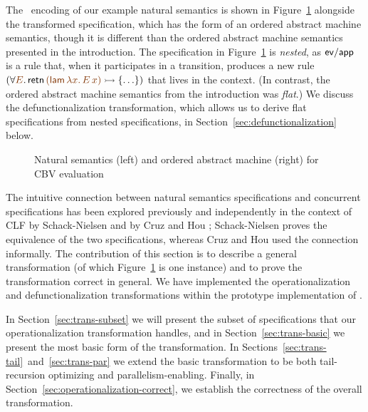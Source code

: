 The \sls~encoding of our example natural semantics is shown in
Figure~\ref{fig:example-transform-cbv} alongside the transformed
specification, which has the form of an ordered abstract machine
semantics, though it is different than the ordered abstract machine
semantics presented in the introduction. The specification in 
Figure~\ref{fig:example-transform-cbv} is 
{\it nested}, as ${\sf ev/app}$ is a rule that, when it
participates in a transition, produces a new rule $(\forall
\lf{E}.\,{\sf retn}\,\lf{({\sf lam}\,\lambda x.\,E\,x)} \lefti \{
\ldots \})$ that lives in the context. (In contrast, the ordered
abstract machine semantics from the introduction was {\it flat}.)  We
discuss the defunctionalization transformation, which allows us to
derive flat specifications from nested specifications, in
Section~\ref{sec:defunctionalization} below.

\begin{figure}
\begin{minipage}[b]{0.36\linewidth}
\end{minipage}
\hspace{0.5cm}
\begin{minipage}[b]{0.64\linewidth}
\end{minipage}
\caption{Natural semantics (left) and ordered abstract machine (right) for 
CBV evaluation}
\label{fig:example-transform-cbv}
\end{figure}

The intuitive connection between natural semantics specifications and
concurrent specifications has been explored previously and
independently in the context of CLF by Schack-Nielsen
\cite{schacknielsen07induction} and by Cruz and Hou
\cite{cruz12parallel}; Schack-Nielsen proves the equivalence of the
two specifications, whereas Cruz and Hou used the connection
informally. The contribution of this section is to describe a general
transformation (of which Figure~\ref{fig:example-transform-cbv} is one
instance) and to prove the transformation correct in general. We have
implemented the operationalization
and defunctionalization transformations within the prototype
implementation of \sls.

In Section~\ref{sec:trans-subset} we will present the subset of
specifications that our operationalization transformation handles, and
in Section~\ref{sec:trans-basic} we present the most basic form of the
transformation.  In
Sections~\ref{sec:trans-tail}~and~\ref{sec:trans-par} we extend the
basic transformation to be both tail-recursion optimizing and
parallelism-enabling. Finally, in
Section~\ref{sec:operationalization-correct}, we establish the
correctness of the overall transformation.


